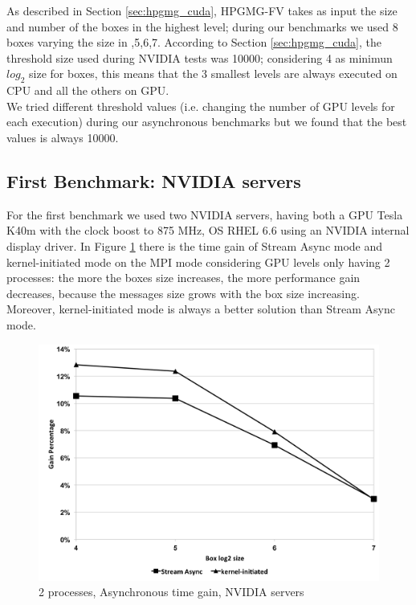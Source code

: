 \documentclass[conference]{IEEEtran}
\begin{document}
As described in Section \ref{sec:hpgmg_cuda}, HPGMG-FV takes as input the size and number of the boxes in the highest level; during our benchmarks we used 8 boxes varying the size in ,5,6,7\rbrack.
According to Section \ref{sec:hpgmg_cuda}, the threshold size used during NVIDIA tests was 10000; considering 4 as minimun $log_2$ size for boxes, this means that the 3 smallest levels are always executed on CPU and all the others on GPU.\\
We tried different threshold values (i.e. changing the number of GPU levels for each execution) during our asynchronous benchmarks but we found that the best values is always 10000.

\subsection{First Benchmark: NVIDIA servers}

For the first benchmark we used two NVIDIA servers, having both a GPU Tesla K40m with the clock boost to 875 MHz, OS RHEL 6.6 using an NVIDIA internal display driver.
In Figure \ref{fig:gain_ivy} there is the time gain of Stream Async mode and kernel-initiated mode on the MPI mode considering GPU levels only having 2 processes: the more the boxes size increases, the more performance gain decreases, because the messages size grows with the box size increasing.
Moreover, kernel-initiated mode is always a better solution than Stream Async mode.

\begin{figure}[h]
\centering
\includegraphics[scale=0.35]{gain_ivy.png}
\caption{2 processes, Asynchronous time gain, NVIDIA servers}
\label{fig:gain_ivy}
\end{figure}
\end{document}
